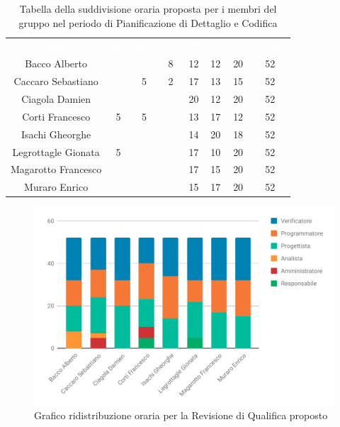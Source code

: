 \begin{table}[H]	
	\begin{center}
	    \begin{tabular}{cccccccc}
			\rowcolor{greySWEight}
			\textcolor{white}{\textbf{Nome}} & \textcolor{white}{\textbf{Re}} & \textcolor{white}{\textbf{Am}} & \textcolor{white}{\textbf{An}} & \textcolor{white}{\textbf{Pj}} & \textcolor{white}{\textbf{Pr}} & \textcolor{white}{\textbf{Ve}} & \textcolor{white}{\textbf{Totale}}
			\\ 
			Bacco Alberto & & & 8 & 12 & 12 & 20 & 52 \\
			Caccaro Sebastiano & & 5 & 2 & 17 & 13 & 15 & 52 \\
			Ciagola Damien & & & & 20 & 12 & 20 & 52 \\
			Corti Francesco & 5 & 5 & & 13 & 17 & 12 & 52 \\
			Isachi Gheorghe & & & & 14 & 20 & 18 & 52 \\
			Legrottagle Gionata & 5 & & & 17 & 10 & 20 & 52 \\
			Magarotto Francesco & & & & 17 & 15 & 20 & 52 \\
			Muraro Enrico & & & & 15 & 17 & 20 & 52 \\
			\end{tabular}
	    \caption{Tabella della suddivisione oraria proposta per i membri del gruppo nel periodo di Pianificazione di Dettaglio e Codifica} \label{tab:tabellaPropostaPersonePianificazione di dettaglio e codifica} 
	\end{center}
\end{table}
\begin{figure}[H]
\includegraphics[width=1\linewidth]{Consuntivo/grafici/ConsPC1.pdf}
\caption{Grafico ridistribuzione oraria per la Revisione di Qualifica proposto}
\end{figure}

